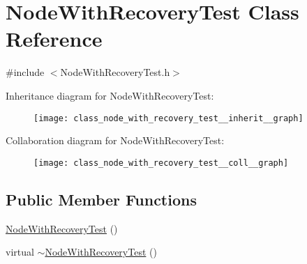 \hypertarget{class_node_with_recovery_test}{}\section{Node\+With\+Recovery\+Test Class Reference}
\label{class_node_with_recovery_test}


{\ttfamily \#include $<$Node\+With\+Recovery\+Test.\+h$>$}



Inheritance diagram for Node\+With\+Recovery\+Test\+:
\nopagebreak
\begin{figure}[H]
\begin{center}
\leavevmode
\texttt{[image: class\_node\_with\_recovery\_test\_\_inherit\_\_graph]}
\end{center}
\end{figure}


Collaboration diagram for Node\+With\+Recovery\+Test\+:
\nopagebreak
\begin{figure}[H]
\begin{center}
\leavevmode
\texttt{[image: class\_node\_with\_recovery\_test\_\_coll\_\_graph]}
\end{center}
\end{figure}
\subsection*{Public Member Functions}
\begin{DoxyCompactItemize}
\item 
\hyperlink{class_node_with_recovery_test_ae8676a479a3ad761eb6cd5069575f51f}{Node\+With\+Recovery\+Test} ()
\item 
virtual \hyperlink{class_node_with_recovery_test_a91ac9cad83523696aee1a5c5718a62af}{$\sim$\+Node\+With\+Recovery\+Test} ()
\end{DoxyCompactItemize}
